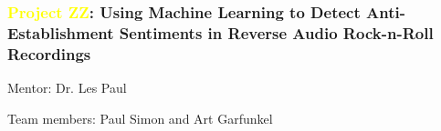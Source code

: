 
    \begin{frame}
        \frametitle{{\textcolor{yellow}{Project ZZ}}: \textcolor{Mahogany}{Using Machine Learning to Detect Anti- Establishment Sentiments in Reverse Audio Rock-n-Roll Recordings}}
        
        Mentor: Dr. Les Paul

        Team members: Paul Simon and Art Garfunkel



    \end{frame}
